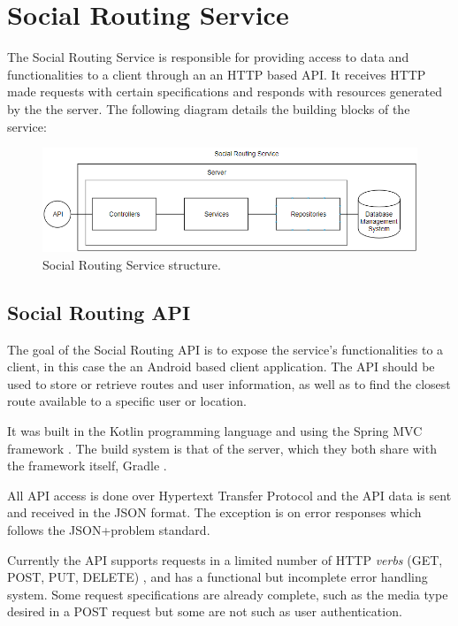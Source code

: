 \documentclass{article}
\begin{document}
        \newpage

    \section{Social Routing Service}

        The Social Routing Service is responsible for providing access to data and functionalities to a client through an an HTTP based API. It receives HTTP made requests
        with certain specifications and responds with resources generated by the the server. The following diagram details the building blocks of the service:

        \begin{figure}[h]            
            \includegraphics[width=\textwidth]{images/project-structure/service-structure.PNG}
            \caption{Social Routing Service structure.}
        \end{figure}  

        \subsection{Social Routing API}          
           
            The goal of the Social Routing API is to expose the service's functionalities to a client, in this case the an Android\cite{androiddocs} based client application. The API
            should be used to store or retrieve routes and user information, as well as to find the closest route available to a specific user or location.\par
            It was built in the Kotlin programming language and using the {Spring MVC framework} \cite{springwebsite}. The build system is that of the server,
            which they both share with the framework itself, Gradle \cite{gradlewebsite}. \par 
            All API access is done over Hypertext Transfer Protocol and the API data is sent and received in the JSON \cite{jsonwebsite} format. The exception is on error responses
            which follows the JSON+problem \cite{jsonproblemonlinedocs} standard. \par
            Currently the API supports requests in a limited number of HTTP \textit{verbs} (GET, POST, PUT, DELETE) \cite{apihttpverbsdocs}, and has a functional but incomplete error handling system. 
            Some request specifications are already complete, such as the media type desired in a POST request but some are not such as user authentication. 
\end{document}
